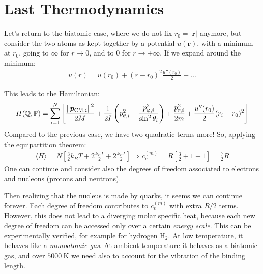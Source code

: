 \documentclass[../template.tex]{subfiles}
\begin{document}
\section{Last Thermodynamics}
Let's return to the biatomic case, where we do not fix $r_0 = |\bm{r}|$ anymore, but consider the two atoms as kept together by a potential $u(\bm{r})$, with a minimum at $r_0$, going to $\infty$ for $r \to 0$, and to $0$ for $r \to +\infty$. If we expand around the minimum:
\begin{align*}
    u(r) = u(r_0) + (r-r_0)^2 \frac{u''(r_0)}{2} + \dots 
\end{align*}

This leads to the Hamiltonian:
\begin{align*}
    H(\mathbb{Q},\mathbb{P}) = \sum_{i=1}^N \left[\frac{\norm{\bm{p}_{\mathrm{CM},i}}^2}{2M} + \frac{1}{2I} \left(p_{\theta,i}^2 + \frac{p_{\varphi,i}^2}{\sin^2 \theta_i} \right)  + \frac{p_{r,i}^2}{2m} + \frac{u''(r_0)}{2} (r_i-r_0)^2   \right]
\end{align*}
Compared to the previous case, we have two quadratic terms more! So, applying the equipartition theorem:
\begin{align*}
    \langle H \rangle = N\left[\frac{3}{2} k_B T + 2 \frac{k_B T}{2} +2 \frac{k_B T}{2}   \right] \Rightarrow c_v^{(m)} = R\left[\frac{3}{2} + 1 + 1 \right] = \frac{7}{2} R 
\end{align*}
One can continue and consider also the degrees of freedom associated to electrons and nucleons (protons and neutrons).

Then realizing that the nucleus is made by quarks, it seems we can continue forever. Each degree of freedom contributes to $c_v^{(m)}$ with extra $R/2$ terms. However, this does not lead to a diverging molar specific heat, because each new degree of freedom can be accessed only over a certain \textit{energy scale}. This can be experimentally verified, for example for hydrogen H$_2$. At low temperature, it behaves like a \textit{monoatomic gas}. At ambient temperature it behaves as a biatomic gas, and over $\SI{5000}{\K}$ we need also to account for the vibration of the binding length.

\medskip
\end{document}
